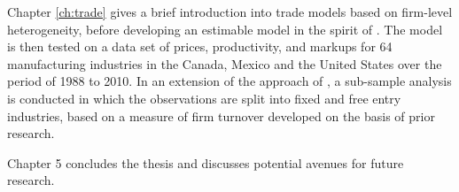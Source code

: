 Chapter \ref{ch:trade} gives a brief introduction into trade models based on firm-level 
heterogeneity, before developing an estimable model in the spirit of \citet{Chen2009}. 
The model is then tested on a data set of prices, productivity, and markups for 
64 manufacturing industries in the Canada, Mexico and the United States over 
the period of 1988 to 2010. In an extension of the approach of \citet{Chen2009},
 a sub-sample analysis is conducted in which the observations are split into fixed and 
free entry industries, based on a measure of firm turnover developed on the basis 
of prior research. 

Chapter 5 concludes the thesis and discusses potential avenues for future research.